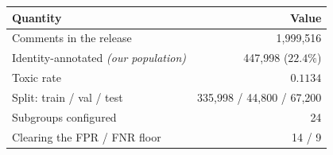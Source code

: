 \begin{tabular}{lr}
\toprule
Quantity & Value \\
\midrule
Comments in the release & 1,999,516 \\
Identity-annotated \emph{(our population)} & 447,998 \; ($22.4\%$) \\
Toxic rate & $0.1134$ \\
\addlinespace
Split: train / val / test & 335,998 / 44,800 / 67,200 \\
\addlinespace
Subgroups configured & 24 \\
Clearing the FPR / FNR floor & 14 / 9 \\
\bottomrule
\end{tabular}

